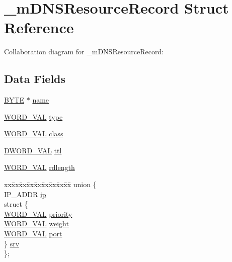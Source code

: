 \hypertarget{struct__m_d_n_s_resource_record}{}\section{\+\_\+m\+D\+N\+S\+Resource\+Record Struct Reference}
\label{struct__m_d_n_s_resource_record}


Collaboration diagram for \+\_\+m\+D\+N\+S\+Resource\+Record\+:
\subsection*{Data Fields}
\begin{DoxyCompactItemize}
\item 
\hyperlink{_generic_type_defs_8h_a4ae1dab0fb4b072a66584546209e7d58}{B\+Y\+T\+E} $\ast$ \hyperlink{struct__m_d_n_s_resource_record_a8be36ea024fc971417695fc83b58febb}{name}
\item 
\hyperlink{union_w_o_r_d___v_a_l}{W\+O\+R\+D\+\_\+\+V\+A\+L} \hyperlink{struct__m_d_n_s_resource_record_a9ae55e4e4d9170990e695b3165dfaf75}{type}
\item 
\hyperlink{union_w_o_r_d___v_a_l}{W\+O\+R\+D\+\_\+\+V\+A\+L} \hyperlink{struct__m_d_n_s_resource_record_a6c250cf4ef59c5f2a8b194d6204ca214}{class}
\item 
\hyperlink{union_d_w_o_r_d___v_a_l}{D\+W\+O\+R\+D\+\_\+\+V\+A\+L} \hyperlink{struct__m_d_n_s_resource_record_aa870a15d42c33e1020feae042f862068}{ttl}
\item 
\hyperlink{union_w_o_r_d___v_a_l}{W\+O\+R\+D\+\_\+\+V\+A\+L} \hyperlink{struct__m_d_n_s_resource_record_a6a0c8277d98664a2fb6307181c99b51f}{rdlength}
\item 
\begin{tabbing}
xx\=xx\=xx\=xx\=xx\=xx\=xx\=xx\=xx\=\kill
union \{\\
\>IP\_ADDR \hyperlink{struct__m_d_n_s_resource_record_a9d9dd79513ec44cebf281f569e85eadc}{ip}\\
\>struct \{\\
\>\>\hyperlink{union_w_o_r_d___v_a_l}{WORD\_VAL} \hyperlink{struct__m_d_n_s_resource_record_ae7ba91b5092176acf23540d2526a36c5}{priority}\\
\>\>\hyperlink{union_w_o_r_d___v_a_l}{WORD\_VAL} \hyperlink{struct__m_d_n_s_resource_record_a57cc215796b6e6ba53c773e1dc2f1932}{weight}\\
\>\>\hyperlink{union_w_o_r_d___v_a_l}{WORD\_VAL} \hyperlink{struct__m_d_n_s_resource_record_a89033bfadfdf14dbf01960a1600fb682}{port}\\
\>\} \hyperlink{struct__m_d_n_s_resource_record_ad81a3ff0d335297b2ed41298a66d2c9e}{srv}\\
\}; \\


\end{tabbing}
\end{DoxyCompactItemize}
